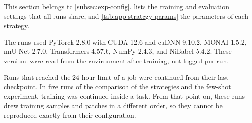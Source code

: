 This section belongs to \cref{subsec:exp-config}.
 lists the training and evaluation settings that all runs share, and \cref{tab:app-strategy-params} the parameters of each strategy.

The runs used PyTorch 2.8.0 with CUDA 12.6 and cuDNN 9.10.2, MONAI 1.5.2, nnU-Net 2.7.0, Transformers 4.57.6, NumPy 2.4.3, and NiBabel 5.4.2.
These versions were read from the environment after training, not logged per run.

Runs that reached the 24-hour limit of a job were continued from their last checkpoint.
In five runs of the comparison of the strategies and the few-shot experiment, training was continued inside a task.
From that point on, these runs drew training samples and patches in a different order, so they cannot be reproduced exactly from their configuration.

\begin{table}[tb]
\centering
\caption[Training and evaluation settings shared by all runs]{Training and evaluation settings shared by all runs (\cref{sec:method-setting-protocol,sec:method-adaptation}).}
\label{tab:app-hparams}

\end{table}

\begin{table}[tb]
\centering
\caption[Parameters of the strategies]{Parameters of the strategies (\cref{sec:method-strategies}). Sequential fine-tuning has no parameters of its own. Bold: rank used in the comparison of the strategies. The scaling factor $\gamma_r = \alpha/\sqrt{r}$ is listed in the order of the ranks. The ensemble interval applies only to the weight ensemble, which is reported as an additional evaluation (\cref{sec:app-additional}). The prompt-tuning strategy without gradient scaling uses the same parameters with $\xi_{\mathcal{S},t} = 1$.}
\label{tab:app-strategy-params}

\end{table}

